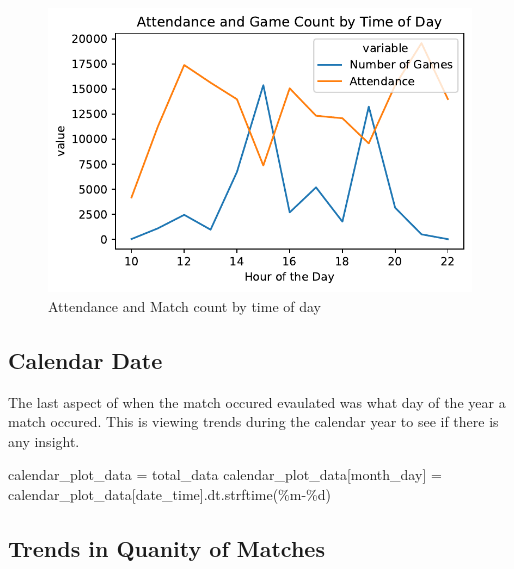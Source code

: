 \documentclass[
  letterpaper,
  DIV=11,
  numbers=noendperiod]{scrartcl}
\newenvironment{Shaded}{\begin{snugshade}}{\end{snugshade}}
\newcommand{\NormalTok}[1]{\textcolor[rgb]{0.00,0.23,0.31}{#1}}
\newcommand{\OperatorTok}[1]{\textcolor[rgb]{0.37,0.37,0.37}{#1}}
\newcommand{\SpecialCharTok}[1]{\textcolor[rgb]{0.37,0.37,0.37}{#1}}
\newcommand{\StringTok}[1]{\textcolor[rgb]{0.13,0.47,0.30}{#1}}
\begin{document}
\begin{figure}[H]

{\centering \includegraphics{Blog_post_files/figure-pdf/fig-attendance_time-output-1.pdf}

}

\caption{\label{fig-attendance_time}Attendance and Match count by time
of day}

\end{figure}

\hypertarget{calendar-date}{%
\subsection{Calendar Date}\label{calendar-date}}

The last aspect of when the match occured evaulated was what day of the
year a match occured. This is viewing trends during the calendar year to
see if there is any insight.

\begin{Shaded}
\begin{Highlighting}[]
\NormalTok{calendar\_plot\_data }\OperatorTok{=}\NormalTok{ total\_data}
\NormalTok{calendar\_plot\_data[}\StringTok{\textquotesingle{}month\_day\textquotesingle{}}\NormalTok{] }\OperatorTok{=}\NormalTok{ calendar\_plot\_data[}\StringTok{\textquotesingle{}date\_time\textquotesingle{}}\NormalTok{].dt.strftime(}\StringTok{\textquotesingle{}\%m{-}}\SpecialCharTok{\%d}\StringTok{\textquotesingle{}}\NormalTok{)}
\end{Highlighting}
\end{Shaded}

\hypertarget{trends-in-quanity-of-matches}{%
\subsection{Trends in Quanity of
Matches}\label{trends-in-quanity-of-matches}}
\end{document}
